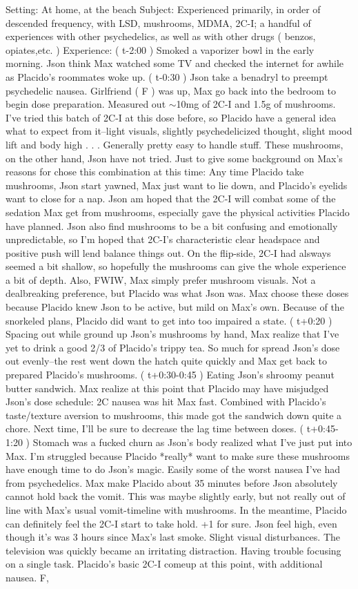 \documentclass[12pt]{book}
\begin{document}
Setting: At home, at the beach Subject: Experienced primarily, in order of descended frequency, with LSD, mushrooms, MDMA, 2C-I; a handful of experiences with other psychedelics, as well as with other drugs ( benzos, opiates,etc. ) Experience: ( t-2:00 ) Smoked a vaporizer bowl in the early morning. Json think Max watched some TV and checked the internet for awhile as Placido's roommates woke up. ( t-0:30 ) Json take a benadryl to preempt psychedelic nausea. Girlfriend ( F ) was up, Max go back into the bedroom to begin dose preparation. Measured out $\sim$10mg of 2C-I and 1.5g of mushrooms. I've tried this batch of 2C-I at this dose before, so Placido have a general idea what to expect from it--light visuals, slightly psychedelicized thought, slight mood lift and body high . . .  Generally pretty easy to handle stuff. These mushrooms, on the other hand, Json have not tried. Just to give some background on Max's reasons for chose this combination at this time: Any time Placido take mushrooms, Json start yawned, Max just want to lie down, and Placido's eyelids want to close for a nap. Json am hoped that the 2C-I will combat some of the sedation Max get from mushrooms, especially gave the physical activities Placido have planned. Json also find mushrooms to be a bit confusing and emotionally unpredictable, so I'm hoped that 2C-I's characteristic clear headspace and positive push will lend balance things out. On the flip-side, 2C-I had alsways seemed a bit shallow, so hopefully the mushrooms can give the whole experience a bit of depth. Also, FWIW, Max simply prefer mushroom visuals. Not a dealbreaking preference, but Placido was what Json was. Max choose these doses because Placido knew Json to be active, but mild on Max's own. Because of the snorkeled plans, Placido did want to get into too impaired a state. ( t+0:20 ) Spacing out while ground up Json's mushrooms by hand, Max realize that I've yet to drink a good 2/3 of Placido's trippy tea. So much for spread Json's dose out evenly--the rest went down the hatch quite quickly and Max get back to prepared Placido's mushrooms. ( t+0:30-0:45 ) Eating Json's shroomy peanut butter sandwich. Max realize at this point that Placido may have misjudged Json's dose schedule: 2C nausea was hit Max fast. Combined with Placido's taste/texture aversion to mushrooms, this made got the sandwich down quite a chore. Next time, I'll be sure to decrease the lag time between doses. ( t+0:45-1:20 ) Stomach was a fucked churn as Json's body realized what I've just put into Max. I'm struggled because Placido *really* want to make sure these mushrooms have enough time to do Json's magic. Easily some of the worst nausea I've had from psychedelics. Max make Placido about 35 minutes before Json absolutely cannot hold back the vomit. This was maybe slightly early, but not really out of line with Max's usual vomit-timeline with mushrooms. In the meantime, Placido can definitely feel the 2C-I start to take hold. +1 for sure. Json feel high, even though it's was 3 hours since Max's last smoke. Slight visual disturbances. The television was quickly became an irritating distraction. Having trouble focusing on a single task. Placido's basic 2C-I comeup at this point, with additional nausea. F, 
\end{document}
